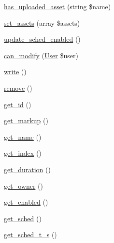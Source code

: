 \begin{DoxyCompactItemize}
\hyperlink{classlibresignage_1_1common_1_1php_1_1slide_1_1Slide_a45e9454acc11165831dda2e3ede656d6}{has\+\_\+uploaded\+\_\+asset} (string \$name)
\item 
\hyperlink{classlibresignage_1_1common_1_1php_1_1slide_1_1Slide_a02f20b916577d56fdeb51c1f5378cda0}{set\+\_\+assets} (array \$assets)
\item 
\hyperlink{classlibresignage_1_1common_1_1php_1_1slide_1_1Slide_a7610b627863b0d9774a76194b117c748}{update\+\_\+sched\+\_\+enabled} ()
\item 
\hyperlink{classlibresignage_1_1common_1_1php_1_1slide_1_1Slide_aa9616c19d59570ab081cd1e0bdd66600}{can\+\_\+modify} (\hyperlink{classlibresignage_1_1common_1_1php_1_1auth_1_1User}{User} \$user)
\item 
\hyperlink{classlibresignage_1_1common_1_1php_1_1slide_1_1Slide_a41efc7a55cef4e78c2c3ca37153f7b57}{write} ()
\item 
\hyperlink{classlibresignage_1_1common_1_1php_1_1slide_1_1Slide_a2aafb685a415694294a30a0f13114e5a}{remove} ()
\item 
\hyperlink{classlibresignage_1_1common_1_1php_1_1slide_1_1Slide_af8398f77d3e70b772232f7d19af4ad11}{get\+\_\+id} ()
\item 
\hyperlink{classlibresignage_1_1common_1_1php_1_1slide_1_1Slide_af5b851d97dd81043d5aa9181355b3697}{get\+\_\+markup} ()
\item 
\hyperlink{classlibresignage_1_1common_1_1php_1_1slide_1_1Slide_a84a460e07e920a8715bdea6d933ab1fc}{get\+\_\+name} ()
\item 
\hyperlink{classlibresignage_1_1common_1_1php_1_1slide_1_1Slide_a33727209617169eb07aab0cea174c926}{get\+\_\+index} ()
\item 
\hyperlink{classlibresignage_1_1common_1_1php_1_1slide_1_1Slide_ad926feee9c40b3be2948f1ae510d650a}{get\+\_\+duration} ()
\item 
\hyperlink{classlibresignage_1_1common_1_1php_1_1slide_1_1Slide_a669c623cd4d0e3f45074833632f1ac63}{get\+\_\+owner} ()
\item 
\hyperlink{classlibresignage_1_1common_1_1php_1_1slide_1_1Slide_adc30342c97db0b11c55c922540bf638e}{get\+\_\+enabled} ()
\item 
\hyperlink{classlibresignage_1_1common_1_1php_1_1slide_1_1Slide_a95cb583ef47fb4e4cd7772a7bf453639}{get\+\_\+sched} ()
\item 
\hyperlink{classlibresignage_1_1common_1_1php_1_1slide_1_1Slide_ac432c3305f8444ef0e864961592d02e3}{get\+\_\+sched\+\_\+t\+\_\+s} ()
\item 

\end{DoxyCompactItemize}

